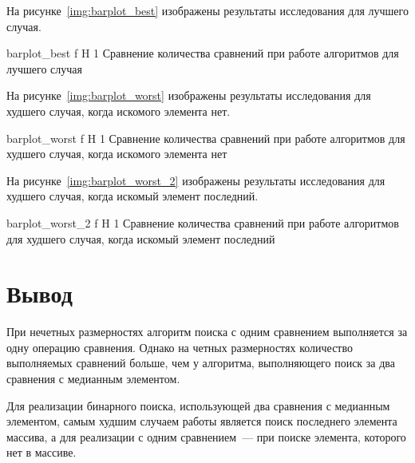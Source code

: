 На рисунке~\ref{img:barplot_best} изображены результаты исследования для лучшего случая.

	{barplot_best}
	{f}
	{H}
	{1\textwidth}
	{Сравнение количества сравнений при работе алгоритмов для лучшего случая}
	
На рисунке~\ref{img:barplot_worst} изображены результаты исследования для худшего случая, когда искомого элемента нет.

	{barplot_worst}
	{f}
	{H}
	{1\textwidth}
	{Сравнение количества сравнений при работе алгоритмов для худшего случая, когда искомого элемента нет}
	
На рисунке~\ref{img:barplot_worst_2} изображены результаты исследования для худшего случая, когда искомый элемент последний.

{barplot_worst_2}
{f}
{H}
{1\textwidth}
{Сравнение количества сравнений при работе алгоритмов для худшего случая, когда искомый элемент последний}

\section{Вывод}
При нечетных размерностях алгоритм поиска с одним сравнением выполняется за одну операцию сравнения. 
Однако на четных размерностях количество выполняемых сравнений больше, чем у алгоритма, выполняющего поиск за два сравнения с медианным элементом.

Для реализации бинарного поиска, использующей два сравнения с медианным элементом, самым худшим случаем работы является поиск последнего элемента массива, а для реализации с одним сравнением~--- при поиске элемента, которого нет в массиве.

